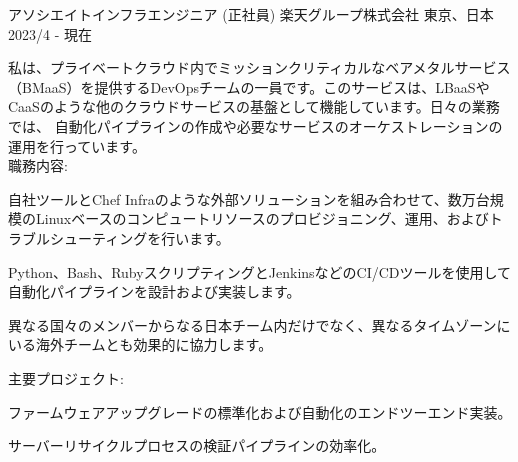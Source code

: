 

\begin{cventries}

  \cventry
    {アソシエイトインフラエンジニア (正社員)} %
    {楽天グループ株式会社} %
    {東京、日本} %
    {2023/4 - 現在} %
    {
      \begin{cvjobdesc} %
        私は、プライベートクラウド内でミッションクリティカルなベアメタルサービス（BMaaS）を提供するDevOpsチームの一員です。このサービスは、LBaaSやCaaSのような他のクラウドサービスの基盤として機能しています。日々の業務では、
        自動化パイプラインの作成や必要なサービスのオーケストレーションの運用を行っています。
        \vspace{2.0mm}
        \\職務内容:
        \begin{cvbullets}
        \item {自社ツールとChef Infraのような外部ソリューションを組み合わせて、数万台規模のLinuxベースのコンピュートリソースのプロビジョニング、運用、およびトラブルシューティングを行います。}
        \item {Python、Bash、RubyスクリプティングとJenkinsなどのCI/CDツールを使用して自動化パイプラインを設計および実装します。}
        \item {異なる国々のメンバーからなる日本チーム内だけでなく、異なるタイムゾーンにいる海外チームとも効果的に協力します。}
        \end{cvbullets}
        \vspace{2.0mm}
        主要プロジェクト:
        \begin{cvbullets}
        \item {ファームウェアアップグレードの標準化および自動化のエンドツーエンド実装。}
        \item {サーバーリサイクルプロセスの検証パイプラインの効率化。}
        \end{cvbullets}
      \end{cvjobdesc}
    }



\end{cventries}
